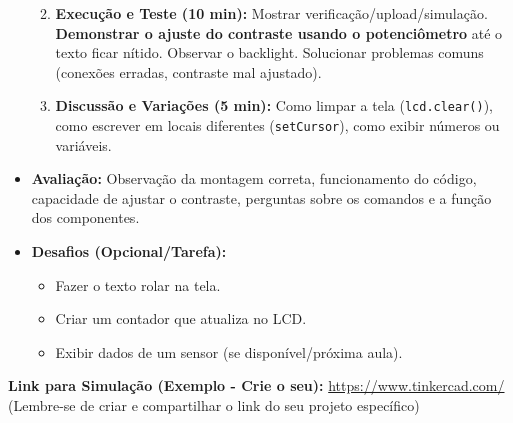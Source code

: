 \documentclass[a4paper,12pt]{article}
\begin{document}
\begin{itemize}
\begin{enumerate}
\begin{itemize}
            \end{itemize}
        \item \textbf{Execução e Teste (10 min):} Mostrar verificação/upload/simulação. \textbf{Demonstrar o ajuste do contraste usando o potenciômetro} até o texto ficar nítido. Observar o backlight. Solucionar problemas comuns (conexões erradas, contraste mal ajustado).
        \item \textbf{Discussão e Variações (5 min):} Como limpar a tela (\texttt{lcd.clear()}), como escrever em locais diferentes (\texttt{setCursor}), como exibir números ou variáveis.
    \end{enumerate}
    \item \textbf{Avaliação:} Observação da montagem correta, funcionamento do código, capacidade de ajustar o contraste, perguntas sobre os comandos e a função dos componentes.
    \item \textbf{Desafios (Opcional/Tarefa):}
        \begin{itemize}
            \item Fazer o texto rolar na tela.
            \item Criar um contador que atualiza no LCD.
            \item Exibir dados de um sensor (se disponível/próxima aula).
        \end{itemize}
\end{itemize}

\vspace{0.5cm}
\noindent
\textbf{Link para Simulação (Exemplo - Crie o seu):} \url{https://www.tinkercad.com/} (Lembre-se de criar e compartilhar o link do seu projeto específico)
\end{document}
